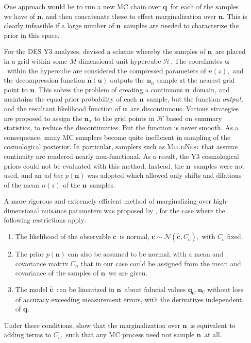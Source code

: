 \documentclass[linenumbers, onecolumn]{aastex63}
\newcommand{\vecc}{\ensuremath{\mathbf{c}}}
\newcommand{\vecq}{\ensuremath{\mathbf{q}}}
\newcommand{\vecn}{\ensuremath{\mathbf{n}}}
\newcommand{\vecu}{\ensuremath{\mathbf{u}}}
\newcommand{\hatc}{\ensuremath{\hat{\mathbf{c}}}}
\newcommand{\covm}{C}
\begin{document}
One approach would be to run a new MC chain over \vecq\ for each of the samples we have of \vecn, and then concatenate these to effect marginalization over \vecn.  This is clearly infeasible if a large number of \vecn\ samples are needed to characterize the prior in this space.

For the DES Y3 analyses, \citet{hyperrank} devised a scheme whereby
the samples of \vecn\ are placed in a grid within some $M$-dimensional
unit hypercube $\mathcal{H}$.  The coordinates \vecu\ within the hypercube
are considered the compressed parameters of $n(z),$ and the
decompression function
$\hat{\vecn}(\vecu)$ outputs the $\vecn_\alpha$ sample at the nearest grid point to
  \vecu.  This solves the problem of creating a continuous \vecu\
  domain, and maintains the equal prior probability of each \vecn\
  sample, but the function \emph{output,} and the resultant likelihood
  function of \vecu\, are discontinuous.
Various strategies are proposed to assign the $\vecn_\alpha$ to the grid points in
$\mathcal{H}$ based on summary statistics, to reduce the
discontinuities.  But the function is never smooth.
As a consequence, many MC samplers become quite inefficient in
sampling of the cosmological posterior.  In particular, samplers such as \textsc{MultiNest} that assume continuity are rendered nearly non-functional.  As a result, the Y3 cosmological priors could not be evaluated with this method.  Instead, the \vecn\ samples were not used, and an \textit{ad hoc} $p(\vecn)$ was adopted which allowed only shifts and dilations of the mean $n(z)$ of the \vecn\ samples.

A more rigorous and extremely efficient method of marginalizing over high-dimensional nuisance parameters was proposed by \citet{hans}, for the case where the following restrictions apply:
\begin{enumerate}
\item The likelihood of the observable \vecc\ is normal, $\vecc \sim \mathcal{N}( \hatc, \covm_c),$ with $\covm_c$ fixed.
\item The prior $p(\vecn)$ can also be assumed to be normal, with a mean and covariance matrix $\covm_n$ that in our case could be assigned from the mean and covariance of the samples of \vecn\ we are given.
\item The model \hatc\ can be linearized in \vecn\ about fiducial values $\vecq_0, \vecn_0$ without loss of accuracy exceeding measurement errors, with the derivatives independent of \vecq.
\end{enumerate}
Under these conditions, \citet{hans} show that the marginalization over \vecn\ is equivalent to adding terms to $\covm_c,$ such that any MC process need not sample \vecn\ at all.
\end{document}
